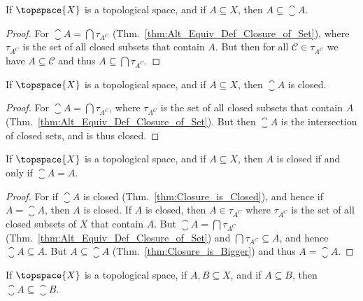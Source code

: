         \begin{theorem}
            \label{thm:Closure_is_Bigger}%
            If $\topspace{X}$ is a topological space, and if
            $A\subseteq{X}$, then $A\subseteq\closure{A}$.
        \end{theorem}
        \begin{proof}
            For $\closure{A}=\bigcap\tau_{A^{C}}$
            (Thm.~\ref{thm:Alt_Equiv_Def_Closure_of_Set}), where
            $\tau_{A^{C}}$ is the set of all closed subsets that contain
            $A$. But then for all $\mathcal{C}\in\tau_{A^{C}}$ we have
            $A\subseteq\mathcal{C}$ and thus
            $A\subseteq\bigcap\tau_{A^{C}}$.
        \end{proof}
        \begin{theorem}
            \label{thm:Closure_is_Closed}%
            If $\topspace{X}$ is a topological space, and if
            $A\subseteq{X}$, then $\closure{A}$ is closed.
        \end{theorem}
        \begin{proof}
            For $\closure{A}=\bigcap\tau_{A^{C}}$, where $\tau_{A^{C}}$ is
            the set of all closed subsets that contain $A$
            (Thm.~\ref{thm:Alt_Equiv_Def_Closure_of_Set}). But then
            $\closure{A}$ is the intersection of closed sets, and is thus
            closed.
        \end{proof}
        \begin{theorem}
            \label{thm:Closed_iff_Cl_A_Eq_A}%
            If $\topspace{X}$ is a topological space, and if
            $A\subseteq{X}$, then $A$ is closed if and only if
            $\closure{A}=A$.
        \end{theorem}
        \begin{proof}
            For if $\closure{A}$ is closed
            (Thm.~\ref{thm:Closure_is_Closed}), and hence if
            $A=\closure{A}$, then $A$ is closed. If $A$ is closed, then
            $A\in\tau_{A^{C}}$ where $\tau_{A^{C}}$ is the set of all closed
            subsets of $X$ that contain $A$. But
            $\closure{A}=\bigcap\tau_{A^{C}}$
            (Thm.~\ref{thm:Alt_Equiv_Def_Closure_of_Set}) and
            $\bigcap\tau_{A^{C}}\subseteq{A}$, and hence
            $\closure{A}\subseteq{A}$. But $A\subseteq\closure{A}$
            (Thm.~\ref{thm:Closure_is_Bigger}) and thus $A=\closure{A}$.
        \end{proof}
        \begin{theorem}
            \label{thm:Closure_Preserves_Inclusion}%
            If $\topspace{X}$ is a topological space, if $A,B\subseteq{X}$,
            and if $A\subseteq{B}$, then $\closure{A}\subseteq\closure{B}$.
        \end{theorem}
